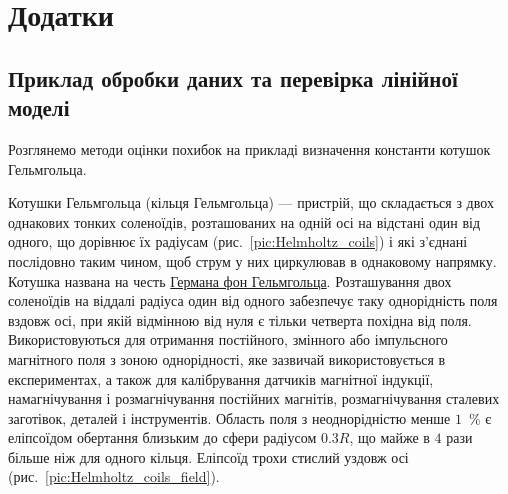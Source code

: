 \documentclass{LabBook}
\edef\infile{ExpData.dat}
\begin{document}


\setcounter{chapter}{1}
\setcounter{section}{0}
\pagestyle{addition}
\renewcommand{\thesection}{\Asbuk{section}}
\chapter*{Додатки}


\section{Приклад обробки даних та перевірка лінійної моделі}
\pgfplotstableread[]{\infile}\datatable


Розглянемо методи оцінки похибок на прикладі визначення константи котушок Гельмгольца.

Котушки Гельмгольца (кільця Гельмгольца) --- пристрій, що складається з двох однакових тонких соленоїдів, розташованих на одній осі на відстані один від одного, що дорівнює їх радіусам (рис.~\ref{pic:Helmholtz_coils}) і які з'єднані послідовно таким чином, щоб струм у них циркулював в однаковому напрямку. Котушка названа на честь \href{https://en.wikipedia.org/wiki/Hermann_von_Helmholtz}{Германа фон Гельмгольца}. Розташування двох соленоїдів на віддалі радіуса один від одного забезпечує таку однорідність поля вздовж осі, при якій відмінною від нуля є тільки четверта похідна від поля. Використовуються для отримання постійного, змінного або імпульсного магнітного поля з зоною однорідності, яке зазвичай використовується в експериментах, а також для калібрування датчиків магнітної індукції, намагнічування і розмагнічування постійних магнітів, розмагнічування сталевих заготівок, деталей і інструментів. Область поля з неоднорідністю менше $1$~\% є еліпсоїдом обертання близьким до сфери радіусом $0.3R$, що майже в $4$ рази більше ніж для одного кільця. Еліпсоїд трохи стислий уздовж осі (рис.~\ref{pic:Helmholtz_coils_field}).
\end{document}
